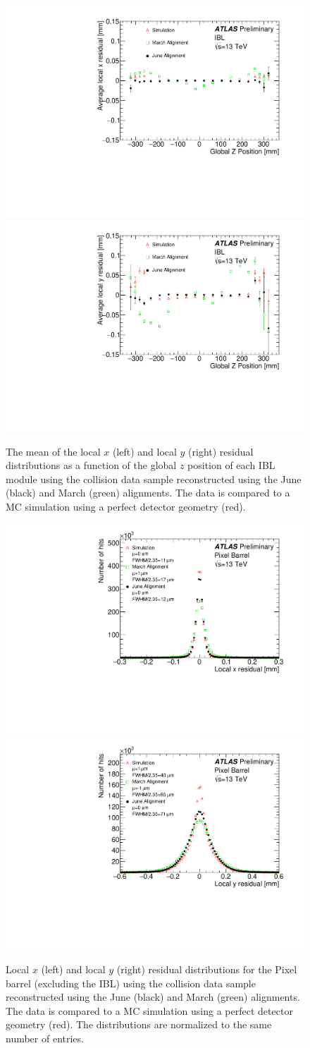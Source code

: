 \begin{figure}[htbp]
  \centering
  \includegraphics[width=.48\textwidth]{figs/alignment/align2015/IBL_xRESvsZ}
  \includegraphics[width=.48\textwidth]{figs/alignment/align2015/IBL_yRESvsZ}
  \caption{The mean of the local $x$ (left) and local $y$ (right) residual distributions as a function of the global $z$ position of each IBL module using the  collision data sample reconstructed using the June (black) and March (green) alignments.  The data is compared to a MC simulation using a perfect detector geometry (red).}
  \label{fig:align_2015_results_ibl_z}
\end{figure}

\begin{figure}[htbp]
  \centering
  \includegraphics[width=.48\textwidth]{figs/alignment/align2015/OLDPIXX}
  \includegraphics[width=.48\textwidth]{figs/alignment/align2015/OLDPIXY}
  \caption{Local $x$ (left) and local $y$ (right) residual distributions for the Pixel barrel (excluding the IBL) using the  collision data sample reconstructed using the June (black) and March (green) alignments.  The data is compared to a MC simulation using a perfect detector geometry (red).  The distributions are normalized to the same number of entries.}
  \label{fig:align_2015_results_pix}
\end{figure}

